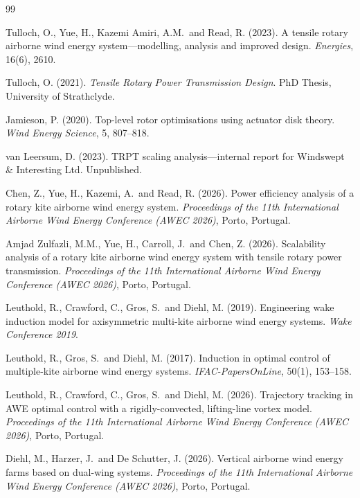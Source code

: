 \documentclass[11pt,a4paper]{article}
\begin{document}

\begin{thebibliography}{99}

Tulloch, O., Yue, H., Kazemi Amiri, A.M.\ and Read, R. (2023).
A tensile rotary airborne wind energy system---modelling, analysis and improved design.
\emph{Energies}, 16(6), 2610.

Tulloch, O. (2021).
\emph{Tensile Rotary Power Transmission Design}.
PhD Thesis, University of Strathclyde.

Jamieson, P. (2020).
Top-level rotor optimisations using actuator disk theory.
\emph{Wind Energy Science}, 5, 807--818.

van Leersum, D. (2023).
TRPT scaling analysis---internal report for Windswept \& Interesting Ltd.
Unpublished.

Chen, Z., Yue, H., Kazemi, A.\ and Read, R. (2026).
Power efficiency analysis of a rotary kite airborne wind energy system.
\emph{Proceedings of the 11th International Airborne Wind Energy Conference (AWEC 2026)}, Porto, Portugal.

Amjad Zulfazli, M.M., Yue, H., Carroll, J.\ and Chen, Z. (2026).
Scalability analysis of a rotary kite airborne wind energy system with tensile rotary power transmission.
\emph{Proceedings of the 11th International Airborne Wind Energy Conference (AWEC 2026)}, Porto, Portugal.

Leuthold, R., Crawford, C., Gros, S.\ and Diehl, M. (2019).
Engineering wake induction model for axisymmetric multi-kite airborne wind energy systems.
\emph{Wake Conference 2019}.

Leuthold, R., Gros, S.\ and Diehl, M. (2017).
Induction in optimal control of multiple-kite airborne wind energy systems.
\emph{IFAC-PapersOnLine}, 50(1), 153--158.

Leuthold, R., Crawford, C., Gros, S.\ and Diehl, M. (2026).
Trajectory tracking in AWE optimal control with a rigidly-convected, lifting-line vortex model.
\emph{Proceedings of the 11th International Airborne Wind Energy Conference (AWEC 2026)}, Porto, Portugal.

Diehl, M., Harzer, J.\ and De Schutter, J. (2026).
Vertical airborne wind energy farms based on dual-wing systems.
\emph{Proceedings of the 11th International Airborne Wind Energy Conference (AWEC 2026)}, Porto, Portugal.


\end{thebibliography}
\end{document}
